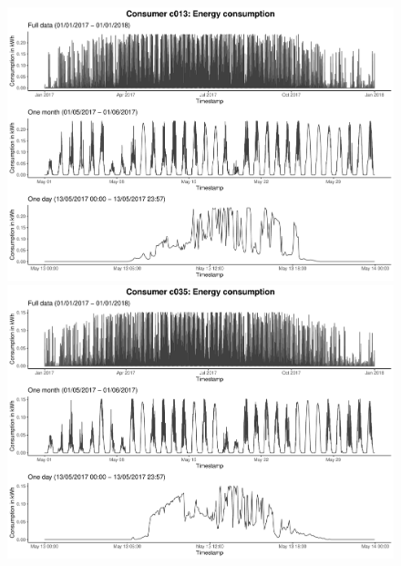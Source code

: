 \begin{figure}
    \centering
    \begin{minipage}[ht]{\dimexpr.5\textheight-0.15em}
    \includegraphics[width=\textwidth]{thesis/graphs/timeseries/c013_cons.pdf}
    \end{minipage}
    \begin{minipage}[ht]{\dimexpr.5\textheight-0.15em}
    \includegraphics[width=\textwidth]{thesis/graphs/timeseries/c035_cons.pdf}
    \end{minipage}\\
    

\end{figure}
